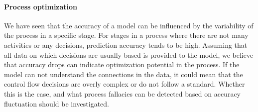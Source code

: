 \paragraph{Process optimization} We have seen that the accuracy of a model can be influenced by the variability of the process in a specific stage.
For stages in a process where there are not many activities or any decisions, prediction accuracy tends to be high.
Assuming that all data on which decisions are usually based is provided to the model, we believe that accuracy drops can indicate optimization potential in the process.
If the model can not understand the connections in the data, it could mean that the control flow decisions are overly complex or do not follow a standard.
Whether this is the case, and what process fallacies can be detected based on accuracy fluctuation should be investigated.
